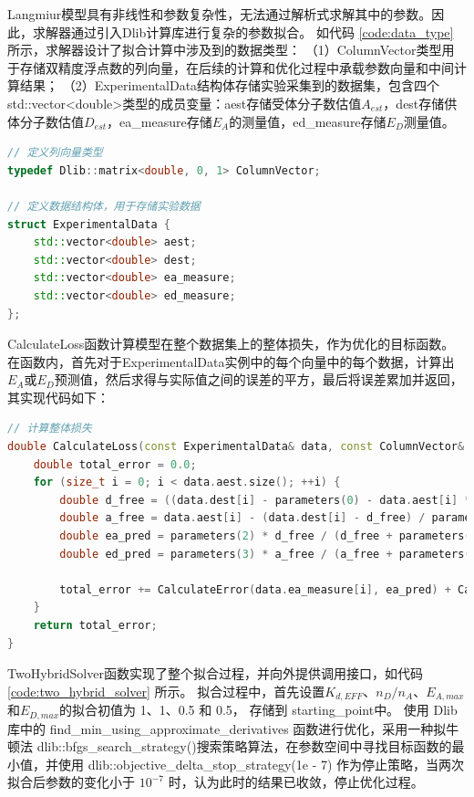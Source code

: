 Langmiur模型具有非线性和参数复杂性，无法通过解析式求解其中的参数。因此，求解器通过引入Dlib计算库进行复杂的参数拟合。
如代码 \ref{code:data_type} 所示，求解器设计了拟合计算中涉及到的数据类型：
（1）ColumnVector类型用于存储双精度浮点数的列向量，在后续的计算和优化过程中承载参数向量和中间计算结果；
（2）ExperimentalData结构体存储实验采集到的数据集，包含四个std::vector<double>类型的成员变量：aest存储受体分子数估值$A_{est}$，dest存储供体分子数估值$D_{est}$，ea\_measure存储$E_A$的测量值，ed\_measure存储$E_D$测量值。
\begin{lstlisting}[language=C++, caption={数据类型}, label={code:data_type}]  
// 定义列向量类型
typedef Dlib::matrix<double, 0, 1> ColumnVector;

// 定义数据结构体，用于存储实验数据
struct ExperimentalData {
    std::vector<double> aest;
    std::vector<double> dest;
    std::vector<double> ea_measure;
    std::vector<double> ed_measure;
};
\end{lstlisting}
CalculateLoss函数计算模型在整个数据集上的整体损失，作为优化的目标函数。
在函数内，首先对于ExperimentalData实例中的每个向量中的每个数据，计算出$E_A$或$E_D$预测值，然后求得与实际值之间的误差的平方，最后将误差累加并返回，其实现代码如下：
\begin{lstlisting}[language=C++, caption={误差计算函数}, label={code:error_calculate}]
// 计算整体损失
double CalculateLoss(const ExperimentalData& data, const ColumnVector& parameters) {
    double total_error = 0.0;
    for (size_t i = 0; i < data.aest.size(); ++i) {
        double d_free = ((data.dest[i] - parameters(0) - data.aest[i] * parameters(1)) + std::sqrt(std::pow(data.dest[i] - parameters(0) - data.aest[i] * parameters(1), 2) + 4 * parameters(0) * data.dest[i])) / 2;
        double a_free = data.aest[i] - (data.dest[i] - d_free) / parameters(1);
        double ea_pred = parameters(2) * d_free / (d_free + parameters(0));
        double ed_pred = parameters(3) * a_free / (a_free + parameters(0) / parameters(1));

        total_error += CalculateError(data.ea_measure[i], ea_pred) + CalculateError(data.ed_measure[i], ed_pred);
    }
    return total_error;
}
\end{lstlisting}
TwoHybridSolver函数实现了整个拟合过程，并向外提供调用接口，如代码 \ref{code:two_hybrid_solver} 所示。
拟合过程中，首先设置$K_{d,EFF}$、$n_D/n_A$、$E_{A,max}$和$E_{D,max}$的拟合初值为 1、1、0.5 和 0.5， 存储到 {starting\_point}中。
使用 {Dlib} 库中的 {find\_min\_using\_approximate\_derivatives} 函数进行优化，采用一种拟牛顿法 {dlib::bfgs\_search\_strategy()}搜索策略算法，在参数空间中寻找目标函数的最小值，并使用 {dlib::objective\_delta\_stop\_strategy(1e - 7)} 作为停止策略，当两次拟合后参数的变化小于 $10^{-7}$ 时，认为此时的结果已收敛，停止优化过程。
